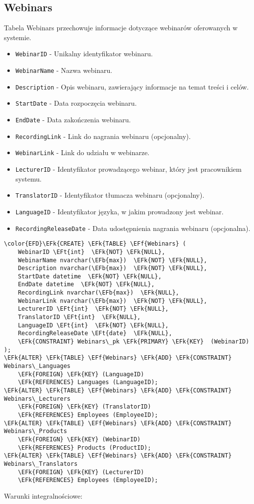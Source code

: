 \documentclass[11pt]{article}
\newcommand{\EFk}[1]{\textcolor{EFk}{\textbf{#1}}} %
\newcommand{\EFb}[1]{\textcolor{EFb}{\textbf{#1}}} %
\newcommand{\EFf}[1]{\textcolor{EFf}{#1}} %
\newcommand{\EFt}[1]{\textcolor{EFt}{\textbf{#1}}} %
\begin{document}
\subsection{Webinars}
\label{sec:org3d5b38a}
Tabela Webinars przechowuje informacje dotyczące webinarów oferowanych w systemie.
\begin{itemize}
\item \texttt{WebinarID} - Unikalny identyfikator webinaru.
\item \texttt{WebinarName} - Nazwa webinaru.
\item \texttt{Description} - Opis webinaru, zawierający informacje na temat treści i celów.
\item \texttt{StartDate} - Data rozpoczęcia webinaru.
\item \texttt{EndDate} - Data zakończenia webinaru.
\item \texttt{RecordingLink} - Link do nagrania webinaru (opcjonalny).
\item \texttt{WebinarLink} - Link do udziału w webinarze.
\item \texttt{LecturerID} - Identyfikator prowadzącego webinar, który jest pracownikiem systemu.
\item \texttt{TranslatorID} - Identyfikator tłumacza webinaru (opcjonalny).
\item \texttt{LanguageID} - Identyfikator języka, w jakim prowadzony jest webinar.
\item \texttt{RecordingReleaseDate} - Data udostępnienia nagrania webinaru (opcjonalna).
\end{itemize}
\begin{Code}
\begin{Verbatim}
\color{EFD}\EFk{CREATE} \EFk{TABLE} \EFf{Webinars} (
    WebinarID \EFt{int}  \EFk{NOT} \EFk{NULL},
    WebinarName nvarchar(\EFb{max})  \EFk{NOT} \EFk{NULL},
    Description nvarchar(\EFb{max})  \EFk{NOT} \EFk{NULL},
    StartDate datetime  \EFk{NOT} \EFk{NULL},
    EndDate datetime  \EFk{NOT} \EFk{NULL},
    RecordingLink nvarchar(\EFb{max})  \EFk{NULL},
    WebinarLink nvarchar(\EFb{max})  \EFk{NOT} \EFk{NULL},
    LecturerID \EFt{int}  \EFk{NOT} \EFk{NULL},
    TranslatorID \EFt{int}  \EFk{NULL},
    LanguageID \EFt{int}  \EFk{NOT} \EFk{NULL},
    RecordingReleaseDate \EFt{date}  \EFk{NULL},
    \EFk{CONSTRAINT} Webinars\_pk \EFk{PRIMARY} \EFk{KEY}  (WebinarID)
);
\EFk{ALTER} \EFk{TABLE} \EFf{Webinars} \EFk{ADD} \EFk{CONSTRAINT} Webinars\_Languages
    \EFk{FOREIGN} \EFk{KEY} (LanguageID)
    \EFk{REFERENCES} Languages (LanguageID);
\EFk{ALTER} \EFk{TABLE} \EFf{Webinars} \EFk{ADD} \EFk{CONSTRAINT} Webinars\_Lecturers
    \EFk{FOREIGN} \EFk{KEY} (TranslatorID)
    \EFk{REFERENCES} Employees (EmployeeID);
\EFk{ALTER} \EFk{TABLE} \EFf{Webinars} \EFk{ADD} \EFk{CONSTRAINT} Webinars\_Products
    \EFk{FOREIGN} \EFk{KEY} (WebinarID)
    \EFk{REFERENCES} Products (ProductID);
\EFk{ALTER} \EFk{TABLE} \EFf{Webinars} \EFk{ADD} \EFk{CONSTRAINT} Webinars\_Translators
    \EFk{FOREIGN} \EFk{KEY} (LecturerID)
    \EFk{REFERENCES} Employees (EmployeeID);
\end{Verbatim}
\end{Code}
Warunki integralnościowe:
\end{document}
